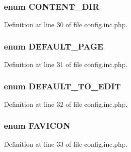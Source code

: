 \hypertarget{config_8inc_8php_a9949c9013641bf07cd112607d200d6ff}{
\subsubsection[{CONTENT\_\-DIR}]{\setlength{\rightskip}{0pt plus 5cm}enum {\bf CONTENT\_\-DIR}}}
\label{config_8inc_8php_a9949c9013641bf07cd112607d200d6ff}


Definition at line 30 of file config.inc.php.

\hypertarget{config_8inc_8php_a4208e17d37801abf0982b2d1e625a8f2}{
\subsubsection[{DEFAULT\_\-PAGE}]{\setlength{\rightskip}{0pt plus 5cm}enum {\bf DEFAULT\_\-PAGE}}}
\label{config_8inc_8php_a4208e17d37801abf0982b2d1e625a8f2}


Definition at line 31 of file config.inc.php.

\hypertarget{config_8inc_8php_a3b22c0132666a0112334ed38a21de8ce}{
\subsubsection[{DEFAULT\_\-TO\_\-EDIT}]{\setlength{\rightskip}{0pt plus 5cm}enum {\bf DEFAULT\_\-TO\_\-EDIT}}}
\label{config_8inc_8php_a3b22c0132666a0112334ed38a21de8ce}


Definition at line 32 of file config.inc.php.

\hypertarget{config_8inc_8php_afd55d95ee6651060397404533516882a}{
\subsubsection[{FAVICON}]{\setlength{\rightskip}{0pt plus 5cm}enum {\bf FAVICON}}}
\label{config_8inc_8php_afd55d95ee6651060397404533516882a}


Definition at line 33 of file config.inc.php.

